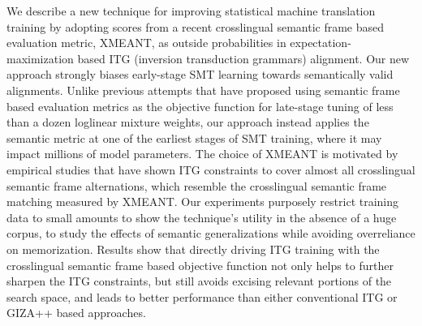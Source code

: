 We describe a new technique for improving statistical machine translation training by adopting scores from a recent crosslingual semantic frame based evaluation metric, XMEANT, as outside probabilities in expectation-maximization based ITG (inversion transduction grammars) alignment. Our new approach strongly biases early-stage SMT learning towards semantically valid alignments. Unlike previous attempts that have proposed using semantic frame based evaluation metrics as the objective function for late-stage tuning of less than a dozen loglinear mixture weights, our approach instead applies the semantic metric at one of the earliest stages of SMT training, where it may impact millions of model parameters. The choice of XMEANT is motivated by empirical studies that have shown ITG constraints to cover almost all crosslingual semantic frame alternations, which resemble the crosslingual semantic frame matching measured by XMEANT. Our experiments purposely restrict training data to small amounts to show the technique's utility in the absence of a huge corpus, to study the effects of semantic generalizations while avoiding overreliance on memorization. Results show that directly driving ITG training with the crosslingual semantic frame based objective function not only helps to further sharpen the ITG constraints, but still avoids excising relevant portions of the search space, and leads to better performance than either conventional ITG or GIZA++ based approaches.
